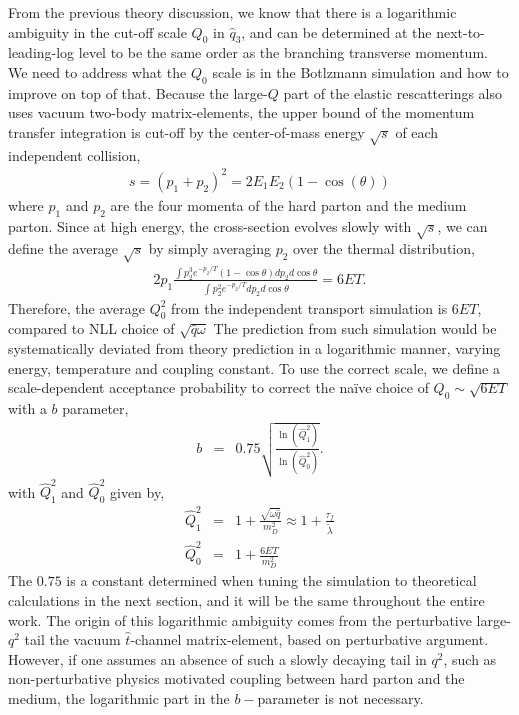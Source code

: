 From the previous theory discussion, we know that there is a logarithmic ambiguity in the cut-off scale $Q_0$ in $\hat{q}_3$, and can be determined at the next-to-leading-log level to be the same order as the branching transverse momentum.
We need to address what the $Q_0$ scale is in the Botlzmann simulation and how to improve on top of that.
Because the large-$Q$ part of the elastic rescatterings also uses vacuum two-body matrix-elements, the upper bound of the momentum transfer integration is cut-off by the center-of-mass energy $\sqrt{s}$ of each independent collision,
\begin{eqnarray}
s = (p_1 + p_2)^2 = 2E_1 E_2 (1-\cos(\theta))
\end{eqnarray}
where $p_1$ and $p_2$ are the four momenta of the hard parton and the medium parton.
Since at high energy, the cross-section evolves slowly with $\sqrt{s}$, we can define the average $\sqrt{s}$ by simply averaging $p_2$ over the thermal distribution,
\begin{eqnarray}
2p_1\frac{ \int p_2^3 e^{-p_2/T}(1-\cos\theta) dp_2 d\cos \theta }{\int p_2^2 e^{-p_2/T} dp_2 d\cos \theta} =  6ET.
\end{eqnarray}
Therefore, the average $Q_0^2$ from the independent transport simulation is $6ET$, compared to NLL choice of $\sqrt{\hat{q} \omega}$
The prediction from such simulation would be systematically deviated from theory prediction in a logarithmic manner, varying energy, temperature and coupling constant.
To use the correct scale, we define a scale-dependent acceptance probability to correct the na\"ive choice of $Q_0 \sim \sqrt{6ET}$ with a $b$ parameter,
\begin{eqnarray}
b &=& 0.75\sqrt{\frac{\ln(\hat{Q}_1^2 )}{\ln(\hat{Q}_0^2 )}}.
\label{eq:NLL-b}
\end{eqnarray}
with $\hat{Q}_1^2$ and $\hat{Q}_0^2$ given by,
\begin{eqnarray}
\hat{Q}_1^2 &=& 1 + \frac{\sqrt{\omega\hat{q}}}{m_D^2} \approx 1 + \frac{\tau_f}{\tilde{\lambda}}\\
\hat{Q}_0^2 &=& 1 + \frac{6ET}{m_D^2}
\end{eqnarray}
The $0.75$ is a constant determined when tuning the simulation to theoretical calculations in the next section, and it will be the same throughout the entire work.
The origin of this logarithmic ambiguity comes from the perturbative large-$q^2$ tail the vacuum $\hat{t}$-channel matrix-element, based on perturbative argument. 
However, if one assumes an absence of such a slowly decaying tail in $q^2$, such as non-perturbative physics motivated coupling between hard parton and the medium, the logarithmic part in the $b-$parameter is not necessary.

